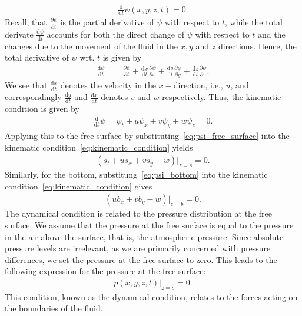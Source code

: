 \begin{align*}
    \frac{\text{d} }{\text{d} t} \psi(x,y,z,t) = 0.
\end{align*}
Recall, that $\frac{\partial \psi}{\partial t}$ is the partial derivative of $\psi$ with respect to $t$, while the total derivate $\frac{\text{d} \psi}{\text{d} t}$ accounts for both the direct change of $\psi$ with respect to $t$ and the changes due to the movement of the fluid in the $x, y$ and $z$ directions.
Hence, the total derivative of $\psi$ wrt. $t$ is given by
\begin{align*}
    \frac{\text{d} \psi}{\text{d} t} &= \frac{\partial \psi}{\partial t} + \frac{\text{d} x}{\text{d} t} \frac{\partial \psi}{\partial x} + \frac{\text{d} y}{\text{d} t}  \frac{\partial \psi}{\partial y} + \frac{\text{d} z}{\text{d} t}  \frac{\partial \psi}{\partial z}.
\end{align*}
We see that $\frac{\text{d}x}{\text{d}t}$ denotes the velocity in the $x-$direction, i.e., $u$, and correspondingly $\frac{\text{d}y}{\text{d}t}$ and $\frac{\text{d}x}{\text{d}t}$ denotes $v$ and $w$ respectively.
Thus, the kinematic condition is given by
\begin{align}\label{eq:kinematic_condition}
    \frac{\text{d} }{\text{d} t} \psi = \psi_t + u \psi_x + v \psi_y + w \psi_z = 0.
\end{align}
Applying this to the free surface by substituting~\eqref{eq:psi_free_surface} into the kinematic condition~\eqref{eq:kinematic_condition} yields
\begin{align}\label{eq:kinematic_condition_free_surface}
    (s_t + u s_x + v s_y - w)|_{z=s} = 0.
\end{align}
Similarly, for the bottom, substitung~\eqref{eq:psi_bottom} into the kinematic condition~\eqref{eq:kinematic_condition} gives
\begin{align}\label{eq:kinematic_condition_bottom}
    (u b_x + v b_y - w)|_{z=b} = 0.
\end{align}
The dynamical condition is related to the pressure distribution at the free surface.
We assume that the pressure at the free surface is equal to the pressure in the air above the surface, that is, the atmospheric pressure.
Since absolute pressure levels are irrelevant, as we are primarily concerned with pressure differences, we set the pressure at the free surface to zero.
This leads to the following expression for the pressure at the free surface:
\begin{align}\label{eq:pressure_free_surface}
    p(x,y,z,t)|_{z = s} = 0.
\end{align}
This condition, known as the dynamical condition, relates to the forces acting on the boundaries of the fluid.


